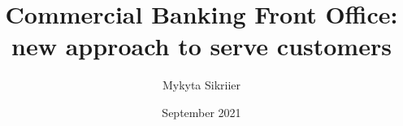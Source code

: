 \documentclass{master_thesis}
\author{Mykyta Sikriier}
\title{
    Commercial Banking Front Office: new approach to serve customers
}
\date{September 2021}
\begin{document}
\maketitle

\makesummary

\tableofcontents














\end{document}
